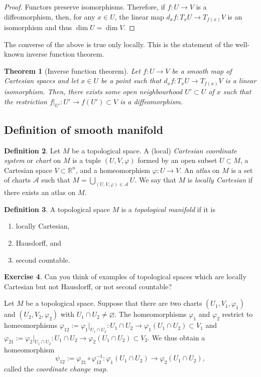 \documentclass[11pt,a4paper]{book}
\newtheorem{thm}{Theorem}[section]
\theoremstyle{remark} \newtheorem{rmk}[thm]{Remark}
\theoremstyle{definition} \newtheorem{defn}[thm]{Definition}
\theoremstyle{definition} \newtheorem{ex}[thm]{Example}
\theoremstyle{definition} \newtheorem{ej}[thm]{Exercise}
\begin{document}
\begin{proof}
Functors preserve isomorphisms. Therefore, if $f:U\rightarrow V$ is a diffeomorphism, then, for any $x\in U$, the linear map $d_xf:T_xU\rightarrow T_{f(x)}V$ is an isomorphism and thus $\dim U = \dim V$.
\end{proof}

The converse of the above is true only locally. This is the statement of the well-known inverse function theorem.

\begin{thm}[Inverse function theorem]
Let $f:U\rightarrow V$ be a smooth map of Cartesian spaces and let $x\in U$ be a point such that $d_xf:T_xU \rightarrow T_{f(x)}V$ is a linear isomorphism. Then, there exists some open neighbourhood $U'\subset U$ of $x$ such that the restriction $f|_{U'}:U'\rightarrow f(U')\subset V$ is a diffeomorphism.
\end{thm}

\subsection{Definition of smooth manifold}
\begin{defn}
Let $M$ be a topological space. A (local) \emph{Cartesian coordinate system} or \emph{chart} on $M$ is a tuple $(U,V,\varphi)$ formed by an open subset $U\subset M$, a Cartesian space $V\subset \mathbb{R}^n$, and a homeomorphism $\varphi:U\rightarrow V$. An \emph{atlas} on $M$ is a set of charts $\mathcal{A}$ such that $M=\bigcup_{(U,V,\varphi)\in \mathcal{A}} U$. We say that $M$ is \emph{locally Cartesian} if there exists an atlas on $M$.
\end{defn}

\begin{defn}
A topological space $M$ is a \emph{topological manifold} if it is
\begin{enumerate}
  \item locally Cartesian,
  \item Hausdorff, and
        \item second countable.
\end{enumerate}
\end{defn}

\begin{ej}
Can you think of examples of topological spaces which are locally Cartesian but not Hausdorff, or not second countable?
\end{ej}

Let $M$ be a topological space. Suppose that there are two charts $(U_1,V_1,\varphi_1)$ and $(U_2,V_2,\varphi_2)$ with $U_1\cap U_2 \neq \varnothing$. The homeomorphisms $\varphi_1$ and $\varphi_2$ restrict to homeomorphisms $\varphi_{12}:=\varphi_1|_{U_1\cap U_2}:U_1\cap U_2\rightarrow \varphi_1(U_1\cap U_2) \subset V_1$ and $\varphi_{21}:=\varphi_2|_{U_1\cap U_2}:U_1\cap U_2\rightarrow \varphi_2(U_1\cap U_2) \subset V_2$. We thus obtain a homeomorphism
\begin{equation*}
\psi_{12}:= \varphi_{21} \circ \varphi_{12}^{-1} : \varphi_1(U_1\cap U_2) \longrightarrow \varphi_2(U_1\cap U_2),
\end{equation*}
called the \emph{coordinate change map}.
\end{document}
